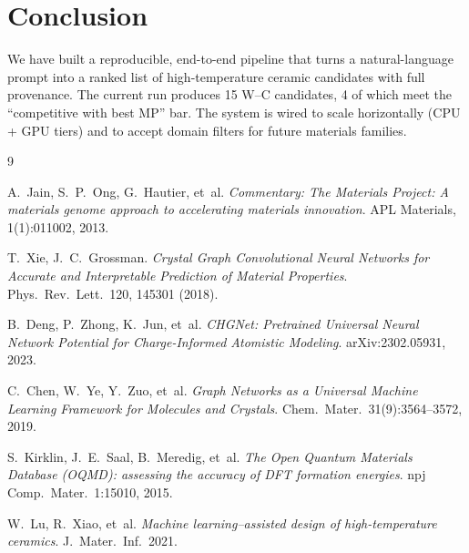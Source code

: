 \documentclass[11pt,a4paper]{report}
\begin{document}
\chapter{Conclusion}

We have built a reproducible, end-to-end pipeline that turns a natural-language prompt into
a ranked list of high-temperature ceramic candidates with full provenance. The current run
produces 15 W--C candidates, 4 of which meet the ``competitive with best MP'' bar. The
system is wired to scale horizontally (CPU + GPU tiers) and to accept domain filters for
future materials families.

\begin{thebibliography}{9}

A.~Jain, S.~P.~Ong, G.~Hautier, et~al.
\textit{Commentary: The Materials Project: A materials genome approach to accelerating
materials innovation}. APL Materials, 1(1):011002, 2013.

T.~Xie, J.~C.~Grossman.
\textit{Crystal Graph Convolutional Neural Networks for Accurate and Interpretable
Prediction of Material Properties}. Phys.\ Rev.\ Lett.\ 120, 145301 (2018).

B.~Deng, P.~Zhong, K.~Jun, et~al.
\textit{CHGNet: Pretrained Universal Neural Network Potential for Charge-Informed
Atomistic Modeling}. arXiv:2302.05931, 2023.

C.~Chen, W.~Ye, Y.~Zuo, et~al.
\textit{Graph Networks as a Universal Machine Learning Framework for Molecules and
Crystals}. Chem.\ Mater.\ 31(9):3564--3572, 2019.

S.~Kirklin, J.~E.~Saal, B.~Meredig, et~al.
\textit{The Open Quantum Materials Database (OQMD): assessing the accuracy of DFT
formation energies}. npj Comp.\ Mater.\ 1:15010, 2015.

W.~Lu, R.~Xiao, et~al.
\textit{Machine learning--assisted design of high-temperature ceramics}. J.\ Mater.\
Inf.\ 2021.

\end{thebibliography}

\appendix
\end{document}
